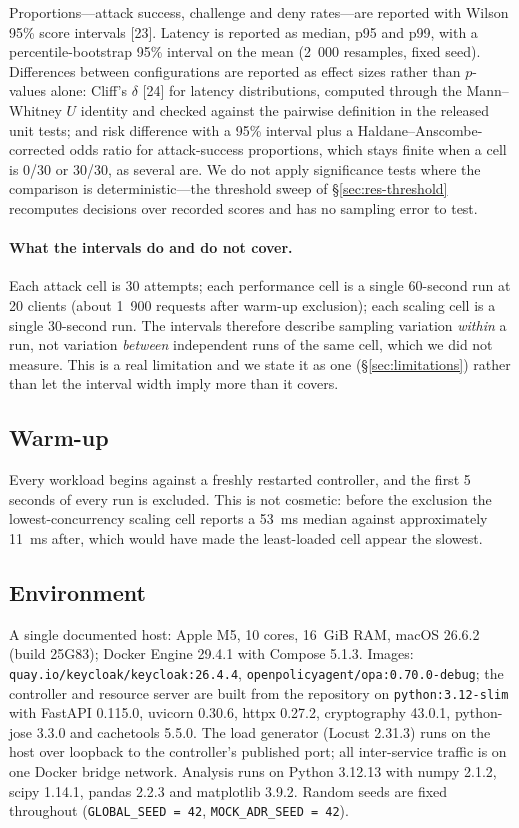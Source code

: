 Proportions---attack success, challenge and deny rates---are reported with Wilson 95\% score intervals [23]. Latency is reported as median, p95 and p99, with a percentile-bootstrap 95\% interval on the mean (2~000 resamples, fixed seed). Differences between configurations are reported as effect sizes rather than $p$-values alone: Cliff's $\delta$ [24] for latency distributions, computed through the Mann--Whitney $U$ identity and checked against the pairwise definition in the released unit tests; and risk difference with a 95\% interval plus a Haldane--Anscombe-corrected odds ratio for attack-success proportions, which stays finite when a cell is 0/30 or 30/30, as several are. We do not apply significance tests where the comparison is deterministic---the threshold sweep of \S\ref{sec:res-threshold} recomputes decisions over recorded scores and has no sampling error to test.

\paragraph{What the intervals do and do not cover.} Each attack cell is 30 attempts; each performance cell is a single 60-second run at 20 clients (about 1~900 requests after warm-up exclusion); each scaling cell is a single 30-second run. The intervals therefore describe sampling variation \textit{within} a run, not variation \textit{between} independent runs of the same cell, which we did not measure. This is a real limitation and we state it as one (\S\ref{sec:limitations}) rather than let the interval width imply more than it covers.

\subsection{Warm-up}

Every workload begins against a freshly restarted controller, and the first 5 seconds of every run is excluded. This is not cosmetic: before the exclusion the lowest-concurrency scaling cell reports a 53~ms median against approximately 11~ms after, which would have made the least-loaded cell appear the slowest.

\subsection{Environment}
\label{sec:method-env}

A single documented host: Apple M5, 10 cores, 16~GiB RAM, macOS 26.6.2 (build 25G83); Docker Engine 29.4.1 with Compose 5.1.3. Images: \texttt{quay.io/keycloak/keycloak:26.4.4}, \texttt{openpolicyagent/opa:0.70.0-debug}; the controller and resource server are built from the repository on \texttt{python:3.12-slim} with FastAPI 0.115.0, uvicorn 0.30.6, httpx 0.27.2, cryptography 43.0.1, python-jose 3.3.0 and cachetools 5.5.0. The load generator (Locust 2.31.3) runs on the host over loopback to the controller's published port; all inter-service traffic is on one Docker bridge network. Analysis runs on Python 3.12.13 with numpy 2.1.2, scipy 1.14.1, pandas 2.2.3 and matplotlib 3.9.2. Random seeds are fixed throughout (\texttt{GLOBAL\_SEED = 42}, \texttt{MOCK\_ADR\_SEED = 42}).

